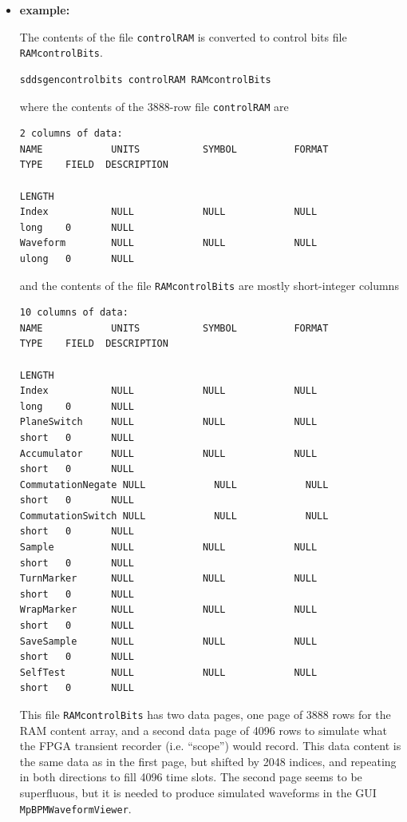 \begin{itemize}
\item {\bf example:} 
%
% 
%

The contents of the file {\tt controlRAM} is converted to control bits
file {\tt RAMcontrolBits}.
\begin{verbatim}
sddsgencontrolbits controlRAM RAMcontrolBits
\end{verbatim}
where the contents of the 3888-row file {\tt controlRAM} are
\begin{verbatim}
2 columns of data:
NAME            UNITS           SYMBOL          FORMAT          TYPE    FIELD  DESCRIPTION
                                                                        LENGTH
Index           NULL            NULL            NULL            long    0       NULL
Waveform        NULL            NULL            NULL            ulong   0       NULL
\end{verbatim}
and the contents of the file {\tt RAMcontrolBits} are mostly short-integer columns
\begin{verbatim}
10 columns of data:
NAME            UNITS           SYMBOL          FORMAT          TYPE    FIELD  DESCRIPTION
                                                                        LENGTH
Index           NULL            NULL            NULL            long    0       NULL
PlaneSwitch     NULL            NULL            NULL            short   0       NULL
Accumulator     NULL            NULL            NULL            short   0       NULL
CommutationNegate NULL            NULL            NULL            short   0       NULL
CommutationSwitch NULL            NULL            NULL            short   0       NULL
Sample          NULL            NULL            NULL            short   0       NULL
TurnMarker      NULL            NULL            NULL            short   0       NULL
WrapMarker      NULL            NULL            NULL            short   0       NULL
SaveSample      NULL            NULL            NULL            short   0       NULL
SelfTest        NULL            NULL            NULL            short   0       NULL
\end{verbatim}
This file {\tt RAMcontrolBits} has two data pages, one page of 3888
rows for the RAM content array, and a second data page of 4096 rows to
simulate what the FPGA transient recorder (i.e. ``scope'') would
record. This data content is the same data as in the first page, but
shifted by 2048 indices, and repeating in both directions to fill 4096
time slots. The second page seems to be superfluous, but it is needed
to produce simulated waveforms in the GUI {\tt MpBPMWaveformViewer}.


\end{itemize}
